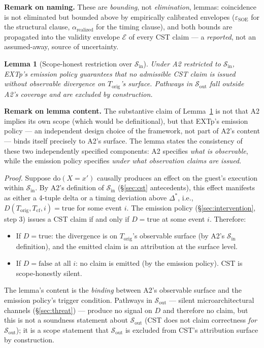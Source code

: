 \documentclass[conference]{IEEEtran}
\newtheorem{lemma}{Lemma}
\newcommand{\Korig}{T_\text{orig}}
\newcommand{\Tcf}{T_\text{cf}}
\newcommand{\Dstar}{\Delta^{*}}
\newcommand{\arealized}{\alpha_\text{realized}}
\newcommand{\dox}[1]{\text{do}(X{=}#1)}
\newcommand{\epsSOE}{\varepsilon_\text{SOE}}
\begin{document}
\textbf{Remark on naming.} These are \emph{bounding}, not
\emph{elimination}, lemmas: coincidence is not eliminated but bounded
above by empirically calibrated envelopes ($\epsSOE$ for the
structural clause, $\arealized$ for the timing clause), and both
bounds are propagated into the validity envelope $\mathcal{E}$ of
every CST claim --- a \emph{reported}, not an assumed-away, source
of uncertainty.

\begin{lemma}[Scope-honest restriction over $\mathcal{S}_\text{in}$]
\label{lem:silent}
Under A2 restricted to $\mathcal{S}_\text{in}$, EXTp's emission
policy guarantees that no admissible CST claim is issued without
observable divergence on $\Korig$'s surface. Pathways in
$\mathcal{S}_\text{out}$ fall outside A2's coverage and are
excluded by construction.
\end{lemma}

\textbf{Remark on lemma content.} The substantive claim of
Lemma~\ref{lem:silent} is not that A2 implies its own scope (which
would be definitional), but that EXTp's emission policy --- an
independent design choice of the framework, not part of A2's
content --- binds itself precisely to A2's surface. The lemma
states the consistency of these two independently specified
components: A2 specifies \emph{what is observable}, while the
emission policy specifies \emph{under what observation claims are
issued}.

\textit{Proof.} Suppose $\dox{x'}$ causally produces an effect on
the guest's execution within $\mathcal{S}_\text{in}$. By A2's
definition of $\mathcal{S}_\text{in}$ (\S\ref{sec:cst}
antecedents), this effect manifests as either a 4-tuple delta or
a timing deviation above $\Dstar$, i.e., $D(\Korig, \Tcf, i) =
\text{true}$ for some event $i$. The emission policy
(\S\ref{sec:intervention}, step 3) issues a CST claim if and only
if $D = \text{true}$ at some event $i$. Therefore:
\begin{itemize}[leftmargin=*]
  \item If $D = \text{true}$: the divergence is on $\Korig$'s
    observable surface (by A2's $\mathcal{S}_\text{in}$
    definition), and the emitted claim is an attribution at the
    surface level.
  \item If $D = \text{false}$ at all $i$: no claim is emitted (by
    the emission policy). CST is scope-honestly silent.
\end{itemize}
The lemma's content is the \emph{binding} between A2's observable
surface and the emission policy's trigger condition. Pathways in
$\mathcal{S}_\text{out}$ --- silent microarchitectural channels
(\S\ref{sec:threat}) --- produce no signal on $D$ and therefore
no claim, but this is not a soundness statement about
$\mathcal{S}_\text{out}$ (CST does not claim correctness
\emph{for} $\mathcal{S}_\text{out}$); it is a scope statement that
$\mathcal{S}_\text{out}$ is excluded from CST's attribution
surface by construction.
\end{document}
